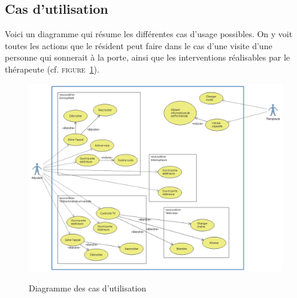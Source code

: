 \subsection{Cas d'utilisation}
Voici un diagramme qui résume les différentes cas d'usage possibles. On y voit toutes les actions que le résident peut faire dans le cas d'une visite d'une personne qui sonnerait à la porte, ainsi que les interventions réalisables par le thérapeute (cf. \textsc{figure~\ref{cas_usage}}).
\begin{figure}[h]
  \caption{Diagramme des cas d'utilisation}
  \includegraphics[width=0.9\linewidth]{1-PreEtude/img/diagramme}
  \label{cas_usage}
\end{figure}
